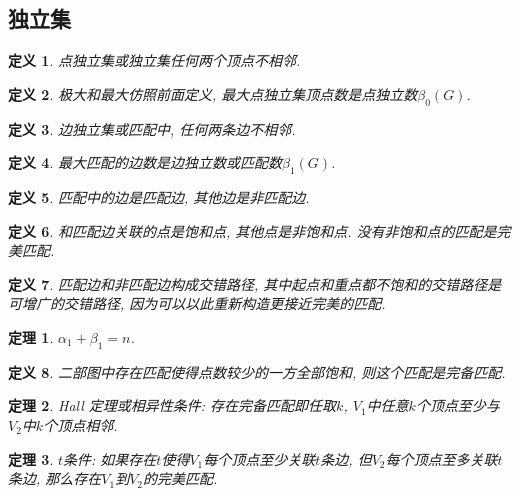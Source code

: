 \documentclass[UTF8,a4paper,11pt]{ctexart}
\newtheorem{definition}{定义}
\newtheorem{theorem}{定理}
\begin{document}
    \subsection{独立集}
      \begin{definition}
        点独立集或独立集任何两个顶点不相邻.
      \end{definition}
      \begin{definition}
        极大和最大仿照前面定义,
        最大点独立集顶点数是点独立数$\beta_0\left(G\right)$.
      \end{definition}
      \begin{definition}
        边独立集或匹配中, 任何两条边不相邻.
      \end{definition}
      \begin{definition}
        最大匹配的边数是边独立数或匹配数$\beta_1\left(G\right)$.
      \end{definition}
      \begin{definition}
        匹配中的边是匹配边, 其他边是非匹配边.
      \end{definition}
      \begin{definition}
        和匹配边关联的点是饱和点, 其他点是非饱和点.
        没有非饱和点的匹配是完美匹配.
      \end{definition}
      \begin{definition}
        匹配边和非匹配边构成交错路径,
        其中起点和重点都不饱和的交错路径是可增广的交错路径,
        因为可以以此重新构造更接近完美的匹配.
      \end{definition}
      \begin{theorem}
        $\alpha_1+\beta_1=n$.
      \end{theorem}
      \begin{definition}
        二部图中存在匹配使得点数较少的一方全部饱和,
        则这个匹配是完备匹配.
      \end{definition}
      \begin{theorem}
        Hall 定理或相异性条件:
        存在完备匹配即任取$k$, 
        $V_1$中任意$k$个顶点至少与$V_2$中$k$个顶点相邻.
      \end{theorem}
      \begin{theorem}
        $t$条件:
        如果存在$t$使得$V_1$每个顶点至少关联$t$条边,
        但$V_2$每个顶点至多关联$t$条边,
        那么存在$V_1$到$V_2$的完美匹配.
      \end{theorem}
\end{document}
